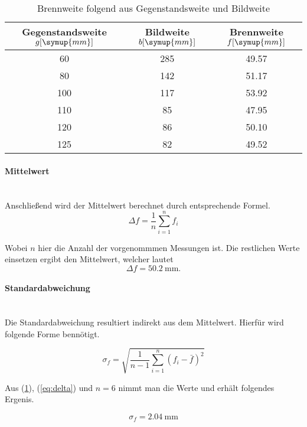  \begin{table}
\centering
\begin{tabular}{c c c}
    Gegenstandsweite $g [\symup{mm}]$ & Bildweite $b [\symup{mm}]$ & Brennweite $f [\symup{mm}]$\\
    \midrule
    60 &285 &49.57\\
    80 &142 &51.17\\
    100& 117&53.92\\
    110& 85 &47.95\\
    120& 86 &50.10\\
    125& 82 &49.52\\
    \bottomrule
    
\end{tabular}
\caption{Brennweite folgend aus Gegenstandsweite und Bildweite}
\label{tab:loesung}
\end{table}

\paragraph{Mittelwert} \mbox{} \\
Anschließend wird der Mittelwert berechnet durch entsprechende Formel.
\begin{equation}
\Delta f = \frac{1}{n} \sum_{i=1}^n f_i 
\end{equation}

Wobei $n$ hier die Anzahl der vorgenommmen Messungen ist. Die restlichen Werte einsetzen ergibt den Mittelwert, welcher lautet
\begin{equation}
\label{eq:delta}
\Delta f=\SI{50.2}{\milli\meter}.
\end{equation}

\paragraph{Standardabweichung} \mbox{} \\
Die Standardabweichung resultiert indirekt aus dem Mittelwert. Hierfür wird folgende Forme bennötigt.

\begin{equation}
\sigma_f = \sqrt{\frac{1}{n-1} \sum_{i=1}^n (f_i - \bar{f})^2}
\end{equation}

Aus (\ref{tab:loesung}), (\ref{eq:delta}) und $n=6$ nimmt man die Werte und erhält folgendes Ergenis.

\begin{equation}
\sigma_f = \SI{2.04}{\milli\meter}
\end{equation}

